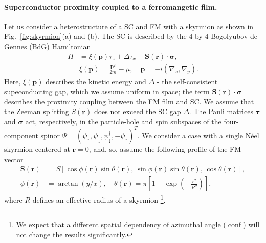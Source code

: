 \documentclass[twocolumn,showpacs,floatfix,longbibliography]{revtex4-1}
\begin{document}
\paragraph*{Superconductor proximity coupled to a ferromangetic film.--- }  \label{sec:model}
Let us consider a heterostructure of a SC and FM with a skyrmion as shown in Fig.~\ref{fig:skyrmion}(a) and (b). The SC is described by the 4-by-4 Bogolyubov-de Gennes (BdG) Hamiltonian 
\begin{align}
 H &= \xi(\bm p)\tau_z+\Delta \tau_x - \bm S(\bm r)\cdot\bm\sigma, \label{ham} \\
   & \xi(\bm p) = \frac{\bm p^2}{2m}-\mu,\quad \bm p = -i(\nabla_x,\nabla_y).
\end{align}
Here, $\xi(\bm p)$ describes the kinetic energy and $\Delta$ - the self-consistent supeconducting gap, which we assume uniform in space; the term $\bm S(\bm r)\cdot\bm\sigma$ describes the proximity coupling between the FM film and SC. We assume that the Zeeman splitting $S(\bm r)$ does not exceed the SC gap $\Delta$. The Pauli matrices $\bm \tau$ and $\bm \sigma$ act, respectively, in the particle-hole and spin subspaces of the four-component spinor $\Psi = (\psi_\uparrow,\psi_\downarrow,\psi^\dagger_\downarrow,-\psi^\dagger_\uparrow)^T$. We consider a case with a single N\'eel skyrmion \cite{Note1} centered at $\bm r = 0$, and, so, assume the following profile of the FM vector
\begin{align}
	\bm S(\bm r) &= S\left[ \cos\phi(\bm r) \sin\theta(\bm r),\, \sin\phi(\bm r)\sin\theta(\bm r),\,\cos\theta(\bm r)\right],\nonumber  \\   
	\phi(\bm r) &= \arctan(y/x),\quad \theta(\bm r) = \pi \left[ 1-\exp\left( -\frac{r^2}{R^2} \right) \right], \label{conf}	
\end{align}
where $R$ defines an effective radius of a skyrmion \footnote{We expect that a different spatial dependency of azimuthal angle (\ref{conf}) will not change the results significantly.}. 
\end{document}
